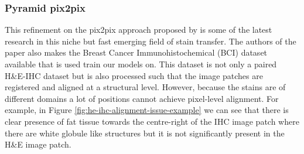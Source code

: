\subsubsection{Pyramid pix2pix}

This refinement on the pix2pix approach proposed by  \textcite{Liu2022BCI:Pix2pix}  is some of the latest research in this niche but fast emerging field of stain transfer. The authors of the paper also makes the Breast Cancer Immunohistochemical (BCI) dataset available that is used train our models on. This dataset is not only a paired H\&E-IHC dataset but is also processed such that the image patches are registered and aligned at a structural level. However, because the stains are of different domains a lot of positions cannot achieve pixel-level alignment. For example, in Figure \ref{fig:he-ihc-alignment-issue-example} we can see that there is clear presence of fat tissue towards the centre-right of the IHC image patch where there are white globule like structures but it is not significantly present in the H\&E image patch.

